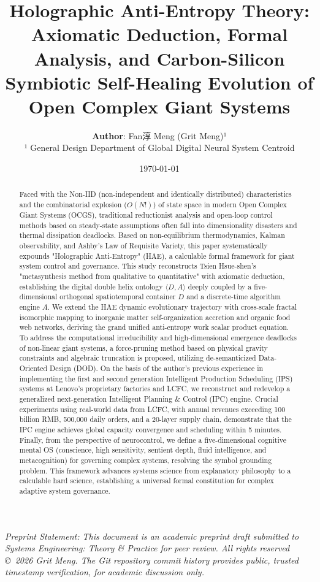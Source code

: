 \documentclass[11pt,a4paper]{article}
\title{\textbf{Holographic Anti-Entropy Theory: Axiomatic Deduction, Formal Analysis, and Carbon-Silicon Symbiotic Self-Healing Evolution of Open Complex Giant Systems}}
\author{\textbf{Author}: Fan淳 Meng (Grit Meng)¹ \\ \small ¹ General Design Department of Global Digital Neural System Centroid}
\date{\today}
\begin{document}
\maketitle

\begin{center}
\small\itshape
Preprint Statement: This document is an academic preprint draft submitted to \emph{Systems Engineering: Theory \& Practice} for peer review. All rights reserved \copyright\ 2026 Grit Meng. The Git repository commit history provides public, trusted timestamp verification, for academic discussion only.
\end{center}
\vspace{1em}

\begin{abstract}
Faced with the Non-IID (non-independent and identically distributed) characteristics and the combinatorial explosion ($O(N!)$) of state space in modern Open Complex Giant Systems (OCGS), traditional reductionist analysis and open-loop control methods based on steady-state assumptions often fall into dimensionality disasters and thermal dissipation deadlocks. Based on non-equilibrium thermodynamics, Kalman observability, and Ashby's Law of Requisite Variety, this paper systematically expounds "Holographic Anti-Entropy" (HAE), a calculable formal framework for giant system control and governance. This study reconstructs Tsien Hsue-shen's "metasynthesis method from qualitative to quantitative" with axiomatic deduction, establishing the digital double helix ontology $\langle D, A \rangle$ deeply coupled by a five-dimensional orthogonal spatiotemporal container $D$ and a discrete-time algorithm engine $A$. We extend the HAE dynamic evolutionary trajectory with cross-scale fractal isomorphic mapping to inorganic matter self-organization accretion and organic food web networks, deriving the grand unified anti-entropy work scalar product equation. To address the computational irreducibility and high-dimensional emergence deadlocks of non-linear giant systems, a force-pruning method based on physical gravity constraints and algebraic truncation is proposed, utilizing de-semanticized Data-Oriented Design (DOD). On the basis of the author's previous experience in implementing the first and second generation Intelligent Production Scheduling (IPS) systems at Lenovo's proprietary factories and LCFC, we reconstruct and redevelop a generalized next-generation Intelligent Planning \& Control (IPC) engine. Crucial experiments using real-world data from LCFC, with annual revenues exceeding 100 billion RMB, 500,000 daily orders, and a 20-layer supply chain, demonstrate that the IPC engine achieves global capacity convergence and scheduling within 5 minutes. Finally, from the perspective of neurocontrol, we define a five-dimensional cognitive mental OS (conscience, high sensitivity, sentient depth, fluid intelligence, and metacognition) for governing complex systems, resolving the symbol grounding problem. This framework advances systems science from explanatory philosophy to a calculable hard science, establishing a universal formal constitution for complex adaptive system governance.
\end{abstract}
\end{document}
